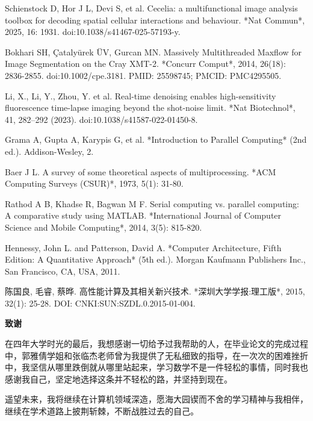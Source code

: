 \documentclass[UTF8,zihao=-4]{oucart}
\begin{document}
\begin{thebibliography}{99}
        Schienstock D, Hor J L, Devi S, et al. Cecelia: a multifunctional image analysis toolbox for decoding spatial cellular interactions and behaviour. *Nat Commun*, 2025, 16: 1931. doi:10.1038/s41467-025-57193-y.
        
        Bokhari SH, Çatalyürek ÜV, Gurcan MN. Massively Multithreaded Maxflow for Image Segmentation on the Cray XMT-2. *Concurr Comput*, 2014, 26(18): 2836-2855. doi:10.1002/cpe.3181. PMID: 25598745; PMCID: PMC4295505.
        
        Li, X., Li, Y., Zhou, Y. et al. Real-time denoising enables high-sensitivity fluorescence time-lapse imaging beyond the shot-noise limit. *Nat Biotechnol*, 41, 282–292 (2023). doi:10.1038/s41587-022-01450-8.
        
        Grama A, Gupta A, Karypis G, et al. *Introduction to Parallel Computing* (2nd ed.). Addison-Wesley, 2.
        
        Baer J L. A survey of some theoretical aspects of multiprocessing. *ACM Computing Surveys (CSUR)*, 1973, 5(1): 31-80.
        
        Rathod A B, Khadse R, Bagwan M F. Serial computing vs. parallel computing: A comparative study using MATLAB. *International Journal of Computer Science and Mobile Computing*, 2014, 3(5): 815-820.
        
        Hennessy, John L. and Patterson, David A. *Computer Architecture, Fifth Edition: A Quantitative Approach* (5th ed.). Morgan Kaufmann Publishers Inc., San Francisco, CA, USA, 2011.
        
        陈国良, 毛睿, 蔡晔. 高性能计算及其相关新兴技术. *深圳大学学报:理工版*, 2015, 32(1): 25-28. DOI: CNKI:SUN:SZDL.0.2015-01-004.
        
    \end{thebibliography}
    \newpage

    \begin{center}
         \textbf{致谢} \\
    \end{center}

    在四年大学时光的最后，我想感谢一切给予过我帮助的人，在毕业论文的完成过程中，郭雅倩学姐和张临杰老师曾为我提供了无私细致的指导，在一次次的困难挫折中，我坚信从哪里跌倒就从哪里站起来，学习数学不是一件轻松的事情，同时我也感谢我自己，坚定地选择这条并不轻松的路，并坚持到现在。
    
    遥望未来，我将继续在计算机领域深造，愿海大园锲而不舍的学习精神与我相伴，继续在学术道路上披荆斩棘，不断战胜过去的自己。
\end{document}
